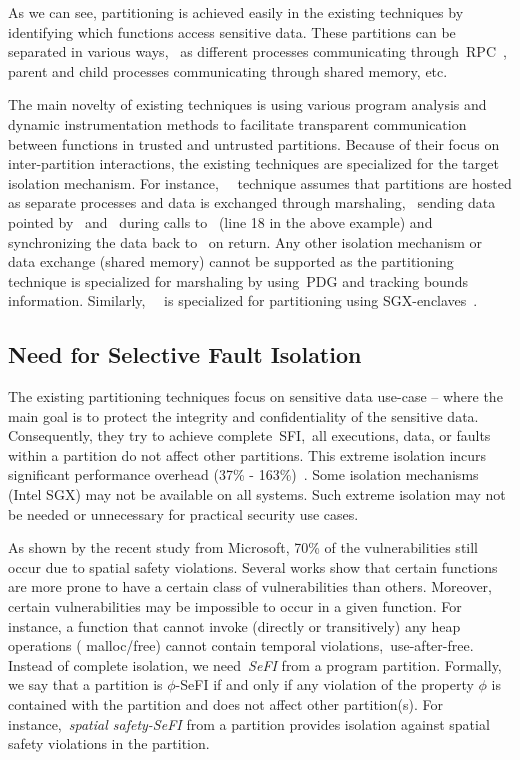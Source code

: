 As we can see, partitioning is achieved easily in the existing techniques by identifying which functions access sensitive data.
These partitions can be separated in various ways,~\eg{} as different processes communicating through~\ac{RPC}~\cite{nelson1981remote}, parent and child processes communicating through shared memory, etc.

The main novelty of existing techniques is using various program analysis and dynamic instrumentation methods to facilitate transparent communication between functions in trusted and untrusted partitions.
Because of their focus on inter-partition interactions, the existing techniques are specialized for the target isolation mechanism. For instance,~\ptrsplit{}~\cite{liu2017ptrsplit} technique assumes that partitions are hosted as separate processes and data is exchanged through marshaling,~\eg{} sending data pointed by~ and~ during calls to~ (\ie line 18 in the above example) and synchronizing the data back to~ on return.
Any other isolation mechanism or data exchange (\eg shared memory) cannot be supported as the partitioning technique is specialized for marshaling by using~\ac{PDG} and tracking bounds information.
Similarly,~\glamdring~\cite{lind2017glamdring} is specialized for partitioning using SGX-enclaves~\cite{costan2016intel}.

\subsection{Need for Selective Fault Isolation}
The existing partitioning techniques focus on sensitive data use-case -- where the main goal is to protect the integrity and confidentiality of the sensitive data.
Consequently, they try to achieve complete~\acf{SFI},~\ie all executions, data, or faults within a partition do not affect other partitions.
This extreme isolation incurs significant performance overhead (37\% - 163\%)~\cite{lind2017glamdring, liu2017ptrsplit}.
Some isolation mechanisms (\eg Intel SGX) may not be available on all systems.
Such extreme isolation may not be needed or unnecessary for practical security use cases.

As shown by the recent study from Microsoft, 70\% of the vulnerabilities still occur due to spatial safety violations.
Several works show that certain functions are more prone to have a certain class of vulnerabilities than others.
Moreover, certain vulnerabilities may be impossible to occur in a given function. For instance, a function that cannot invoke (directly or transitively) any heap operations (\eg{} malloc/free) cannot contain temporal violations,~\eg use-after-free.
Instead of complete isolation, we need~\emph{\acf{SeFI}} from a program partition.
Formally, we say that a partition is $\phi$-\ac{SeFI} if and only if any violation of the property $\phi$ is contained with the partition and does not affect other partition(s).
For instance,~\emph{spatial safety-\ac{SeFI}} from a partition provides isolation against spatial safety violations in the partition.

